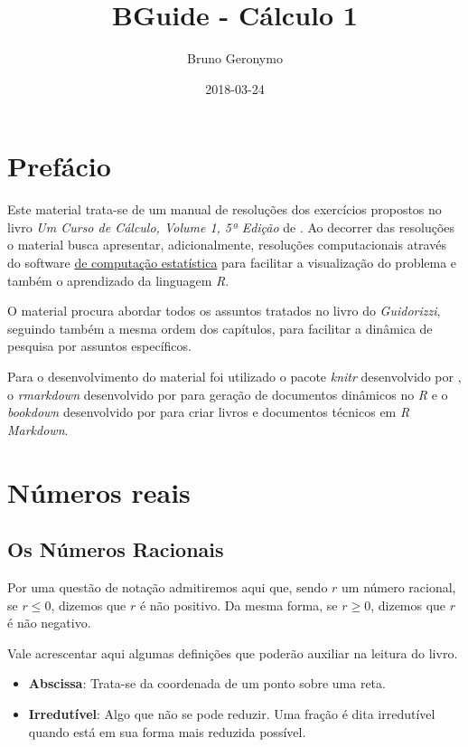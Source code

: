 \documentclass[]{book}
\title{BGuide - Cálculo 1}
\author{Bruno Geronymo}
\date{2018-03-24}
\providecommand{\tightlist}{%
  \setlength{\itemsep}{0pt}\setlength{\parskip}{0pt}}
\begin{document}
\maketitle

{
\setcounter{tocdepth}{1}
\tableofcontents
}
\chapter*{Prefácio}\label{prefacio}

Este material trata-se de um manual de resoluções dos exercícios
propostos no livro \emph{Um Curso de Cálculo, Volume 1, 5ª Edição} de
\citet{guidorizzi2013curso}. Ao decorrer das resoluções o material busca
apresentar, adicionalmente, resoluções computacionais através do
software \href{https://www.r-project.org/}{\citet{R-base} de computação
estatística} para facilitar a visualização do problema e também o
aprendizado da linguagem \emph{R}.

O material procura abordar todos os assuntos tratados no livro do
\emph{Guidorizzi}, seguindo também a mesma ordem dos capítulos, para
facilitar a dinâmica de pesquisa por assuntos específicos.

Para o desenvolvimento do material foi utilizado o pacote \emph{knitr}
desenvolvido por \citet{R-knitr}, o \emph{rmarkdown} desenvolvido por
\citet{R-rmarkdown} para geração de documentos dinâmicos no \emph{R} e o
\emph{bookdown} desenvolvido por \citet{R-bookdown} para criar livros e
documentos técnicos em \emph{R Markdown}.

\chapter{Números reais}\label{numeros-reais}

\section{Os Números Racionais}\label{os-numeros-racionais}

Por uma questão de notação admitiremos aqui que, sendo \(r\) um número
racional, se \(r \leqslant 0\), dizemos que \(r\) é não positivo. Da
mesma forma, se \(r \geqslant 0\), dizemos que \(r\) é não negativo.

Vale acrescentar aqui algumas definições que poderão auxiliar na leitura
do livro.

\begin{itemize}
\tightlist
\item
  \textbf{Abscissa}: Trata-se da coordenada de um ponto sobre uma reta.
\item
  \textbf{Irredutível}: Algo que não se pode reduzir. Uma fração é dita
  irredutível quando está em sua forma mais reduzida possível.
\end{itemize}
\end{document}
